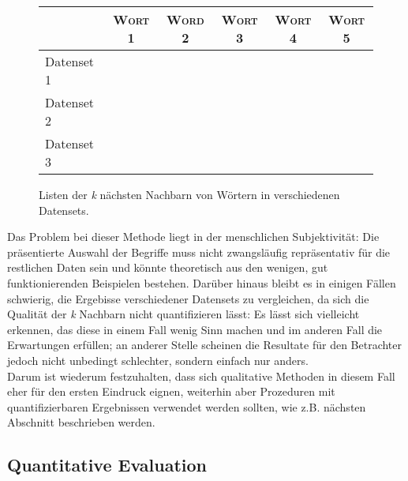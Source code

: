   \begin{figure}[h]
    \begin{tabular}{l|ccccc}
       & \textsc{Wort 1} & \textsc{Word 2} & \textsc{Wort 3} & \textsc{Wort 4} & \textsc{Wort 5} \\
      \hline \hline
      Datenset 1 & & & & & \\
      \hline
      Datenset 2 & & & & & \\
      \hline
      Datenset 3 & & & & & \\
    \end{tabular}
    \caption{Listen der \emph{k} nächsten Nachbarn von Wörtern in verschiedenen Datensets.}
  \end{figure}

  Das Problem bei dieser Methode liegt in der menschlichen Subjektivität: Die präsentierte Auswahl der Begriffe
  muss nicht zwangsläufig repräsentativ für die restlichen Daten sein und könnte theoretisch aus den wenigen,
  gut funktionierenden Beispielen bestehen. Darüber hinaus bleibt es in einigen Fällen schwierig,
  die Ergebisse verschiedener Datensets zu vergleichen, da sich die Qualität der \emph{k} Nachbarn
  nicht quantifizieren lässt: Es lässt sich vielleicht erkennen, das diese in einem Fall wenig Sinn machen und
  im anderen Fall die Erwartungen erfüllen; an anderer Stelle scheinen die Resultate für den Betrachter jedoch nicht
  unbedingt schlechter, sondern einfach nur anders.\\
  Darum ist wiederum festzuhalten, dass sich qualitative Methoden in diesem Fall eher für den ersten Eindruck
  eignen, weiterhin aber Prozeduren mit quantifizierbaren Ergebnissen verwendet werden sollten, wie z.B.
  nächsten Abschnitt beschrieben werden.

  \subsection{Quantitative Evaluation}

